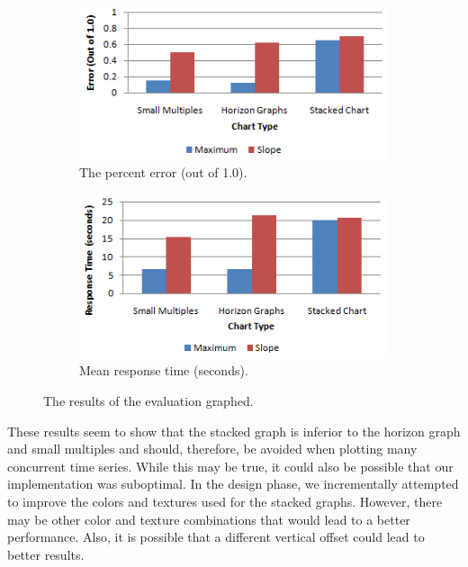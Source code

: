 \documentclass{article}
\begin{document}
\begin{figure}
	\begin{subfigure}[b]{0.49\textwidth}
		\includegraphics[width=\textwidth]{figures/results-error.png}
		\caption{The percent error (out of 1.0).}
		\label{fig:resultsError}
        \end{subfigure}
	\begin{subfigure}[b]{0.49\textwidth}
		\includegraphics[width=\textwidth]{figures/results-time.png}
		\caption{Mean response time (seconds).}
		\label{fig:resultsTime}
        \end{subfigure}
	\caption{The results of the evaluation graphed.}
	\label{fig:results}
\end{figure}

These results seem to show that the stacked graph is inferior to the horizon graph and small multiples and should, therefore, be avoided when plotting many concurrent time series.  While this may be true, it could also be possible that our implementation was suboptimal.  In the design phase, we incrementally attempted to improve the colors and textures used for the stacked graphs.  However, there may be other color and texture combinations that would lead to a better performance.  Also, it is possible that a different vertical offset could lead to better results.
\end{document}
